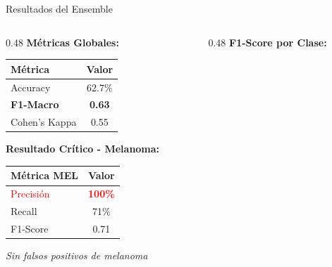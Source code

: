 \documentclass[aspectratio=169]{beamer}
\begin{document}
\begin{frame}{Resultados del Ensemble}

    \begin{columns}[T]
        \begin{column}{0.48\textwidth}
            \textbf{Métricas Globales:}

            \vspace{0.3cm}
            \begin{tabular}{lc}
                \toprule
                \textbf{Métrica} & \textbf{Valor} \\
                \midrule
                Accuracy & 62.7\% \\
                \textbf{F1-Macro} & \textbf{0.63} \\
                Cohen's Kappa & 0.55 \\
                \bottomrule
            \end{tabular}

            \vspace{0.5cm}
            \textbf{Resultado Crítico - Melanoma:}

            \vspace{0.2cm}
            \begin{tabular}{lc}
                \toprule
                \textbf{Métrica MEL} & \textbf{Valor} \\
                \midrule
                \textcolor{red}{Precisión} & \textcolor{red}{\textbf{100\%}} \\
                Recall & 71\% \\
                F1-Score & 0.71 \\
                \bottomrule
            \end{tabular}

            \vspace{0.2cm}
            \small\textit{Sin falsos positivos de melanoma}
        \end{column}

        \begin{column}{0.48\textwidth}
            \textbf{F1-Score por Clase:}


\end{column}
\end{columns}
\end{frame}
\end{document}
